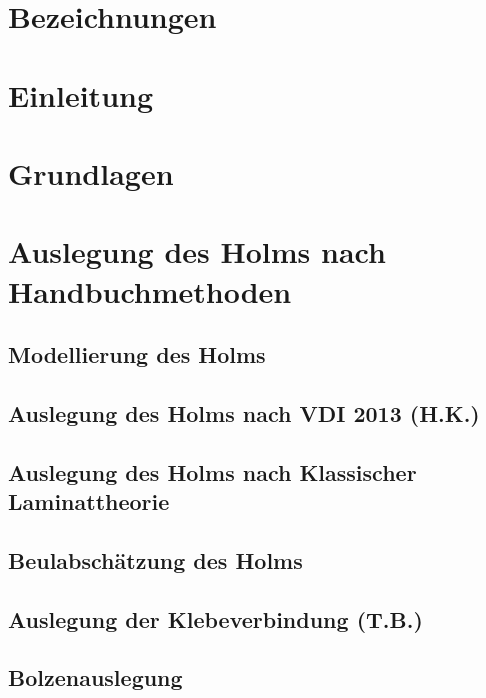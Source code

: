 \documentclass[a4paper,twoside,11pt]{article}
\begin{document}
	
\onehalfspacing
\pagestyle{empty}	


\newpage

\newpage
\pagestyle{plain}
\setcounter{page}{1}
\tableofcontents
\newpage
\section{Bezeichnungen}

\newpage
\section{Einleitung}

\newpage
\section{Grundlagen}

\newpage

\section{Auslegung des Holms nach Handbuchmethoden}
\subsection{Modellierung des Holms}

\newpage
\subsection{Auslegung des Holms nach VDI 2013 (H.K.)}\label{VDI}
\label{VDI2013}

\newpage
\subsection{Auslegung des Holms nach Klassischer Laminattheorie}\label{Puck}

\newpage
\subsection{Beulabschätzung des Holms}

\newpage
\subsection{Auslegung der Klebeverbindung (T.B.)}

\newpage
\subsection{Bolzenauslegung}

\newpage
\end{document}
